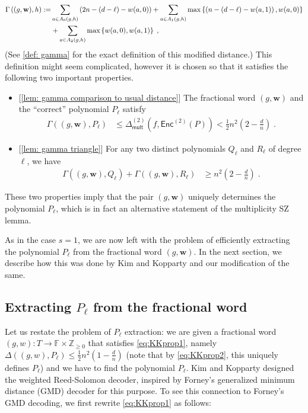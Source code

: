 \documentclass{theoretics}
\def\Integer{\mathbb{Z}}
\def\Field{\mathbb{F}}
\let\Z\Integer
\let\F\Field
\def\vecw{\mathbf{w}}
\newcommand{\enc}{{\mathsf{Enc}}}
\newcommand{\vw}{\vecw}
\begin{document}
	\begin{align}
		\Gamma\left((g,\vw),h\right) := &\sum_{a \in
				A_0(g,h)}\left(2n - (d-\ell) - w(a,0)\right) + \sum_{a \in A_1(g,h)}
		\max\left\{\left( n- (d-\ell) - w(a,1) \right), w(a,0)\right\}\notag\\
		& + \sum_{a \in A_2(g,h)}\max\left\{w(a,0), w(a,1)\right\} \;,\label{eq:ourdistance}
	\end{align}
	(See \cref{def: gamma} for the exact definition of this modified
	distance.) This definition might seem complicated, however it is chosen
	so that it satisfies the following
	two important properties.
	\begin{itemize}
		\item {[\cref{lem: gamma comparison to usual distance}]} The fractional word $(g,\vw)$ and the ``correct'' polynomial
		$P_\ell$ satisfy
		\begin{align}\Gamma((g,\vw),P_\ell) &\leq \Delta_{\mathsf{mult}}^{(2)}(f,\enc^{(2)}(P)) < \frac12
			n^2\left(2-\frac{d}{n}\right)\;.\label{eq:prop1}
		\end{align}
		\item {[\cref{lem: gamma triangle}]} For any two distinct polynomials $Q_\ell$ and $R_\ell$ of
		degree $\ell$, we have
		\begin{align}
			\Gamma((g,\vw), Q_\ell) +
			\Gamma((g,\vw),R_\ell) & \geq n^2\left(2
			-\frac{d}{n}\right)\;. \label{eq:prop2}
		\end{align}
	\end{itemize}
	These two properties imply that the pair $(g,\vw)$ uniquely determines
	the polynomial $P_\ell$, which is in fact an alternative statement of the multiplicity SZ lemma.
	
	As in the case $s=1$, we are now left with the problem of efficiently extracting
	the polynomial $P_\ell$ from the fractional word
	$(g,\vw)$. In the next section, we describe how this was done
	by Kim and Kopparty and our modification of the same.
	
	\subsection{Extracting \texorpdfstring{$P_\ell$}{P l} from the fractional word}
	
	Let us restate the problem of $P_\ell$ extraction: we are given a
	fractional word $(g,w)\colon T \to \F \times \Z_{\geq 0}$ that
	satisfies \eqref{eq:KKprop1}, namely $\Delta((g,w), P_\ell) \leq \frac12
	n^2\left(1-\frac{d}{n}\right)$ (note that by \eqref{eq:KKprop2}, this
	uniquely defines $P_\ell$) and we have to find the polynomial
	$P_\ell$. Kim and Kopparty designed the weighted Reed-Solomon decoder,
	inspired by Forney's generalized minimum distance (GMD)  decoder for
	this purpose. To see this connection to Forney's GMD decoding, we
	first rewrite \eqref{eq:KKprop1} as follows:
	
\end{document}
